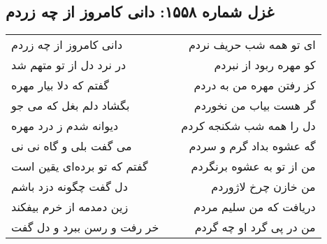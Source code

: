 \begin{center}
\section*{غزل شماره ۱۵۵۸: دانی کامروز از چه زردم}
\label{sec:1558}
\begin{longtable}{l p{0.5cm} r}
دانی کامروز از چه زردم
&&
ای تو همه شب حریف نردم
\\
در نرد دل از تو متهم شد
&&
کو مهره ربود از نبردم
\\
گفتم که دلا بیار مهره
&&
کز رفتن مهره من به دردم
\\
بگشاد دلم بغل که می جو
&&
گر هست بیاب من نخوردم
\\
دیوانه شدم ز درد مهره
&&
دل را همه شب شکنجه کردم
\\
می گفت بلی و گاه نی نی
&&
گه عشوه بداد گرم و سردم
\\
گفتم که تو برده‌ای یقین است
&&
من از تو به عشوه برنگردم
\\
دل گفت چگونه دزد باشم
&&
من خازن چرخ لاژوردم
\\
زین دمدمه از خرم بیفکند
&&
دریافت که من سلیم مردم
\\
خر رفت و رسن ببرد و دل گفت
&&
من در پی گرد او چه گردم
\\
\end{longtable}
\end{center}
